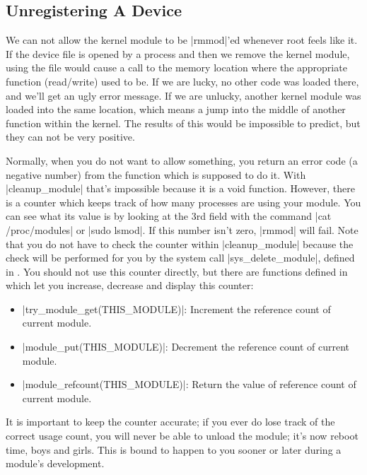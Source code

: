 \documentclass[10pt, oneside]{book}
\begin{document}
\subsection{Unregistering A Device}
\label{sec:unregister_device}
We can not allow the kernel module to be \sh|rmmod|'ed whenever root feels like it.
If the device file is opened by a process and then we remove the kernel module, using the file would cause a call to the memory location where the appropriate function (read/write) used to be.
If we are lucky, no other code was loaded there, and we'll get an ugly error message.
If we are unlucky, another kernel module was loaded into the same location, which means a jump into the middle of another function within the kernel.
The results of this would be impossible to predict, but they can not be very positive.

Normally, when you do not want to allow something, you return an error code (a negative number) from the function which is supposed to do it.
With \cpp|cleanup_module| that's impossible because it is a void function.
However, there is a counter which keeps track of how many processes are using your module.
You can see what its value is by looking at the 3rd field with the command \sh|cat /proc/modules| or \sh|sudo lsmod|.
If this number isn't zero, \sh|rmmod| will fail.
Note that you do not have to check the counter within \cpp|cleanup_module| because the check will be performed for you by the system call \cpp|sys_delete_module|, defined in .
You should not use this counter directly, but there are functions defined in  which let you increase, decrease and display this counter:

\begin{itemize}
  \item \cpp|try_module_get(THIS_MODULE)|: Increment the reference count of current module.
  \item \cpp|module_put(THIS_MODULE)|: Decrement the reference count of current module.
  \item \cpp|module_refcount(THIS_MODULE)|: Return the value of reference count of current module.
\end{itemize}

It is important to keep the counter accurate; if you ever do lose track of the correct usage count, you will never be able to unload the module; it's now reboot time, boys and girls.
This is bound to happen to you sooner or later during a module's development.
\end{document}

